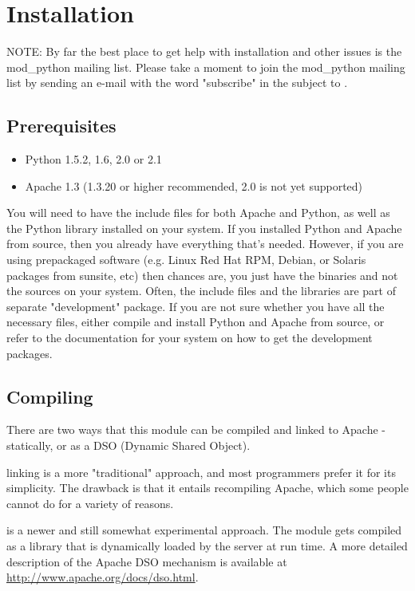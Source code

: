 \chapter{Installation\label{installation}}
NOTE: By far the best place to get help with installation and other
issues is the mod_python mailing list. Please take a moment to join
the mod_python mailing list by sending an e-mail with the word
"subscribe" in the subject to .

\section{Prerequisites\label{inst-prerequisites}}

\begin{itemize}
\item
Python 1.5.2, 1.6, 2.0 or 2.1
\item
Apache 1.3 (1.3.20 or higher recommended, 2.0 is not yet supported) 
\end{itemize}

You will need to have the include files for both Apache and Python, as
well as the Python library installed on your system.  If you installed
Python and Apache from source, then you already have everything that's
needed. However, if you are using prepackaged software (e.g. Linux Red
Hat RPM, Debian, or Solaris packages from sunsite, etc) then chances
are, you just have the binaries and not the sources on your
system. Often, the include files and the libraries are part of
separate "development" package. If you are not sure whether you have
all the necessary files, either compile and install Python and Apache
from source, or refer to the documentation for your system on how to
get the development packages.

\section{Compiling\label{inst-compiling}}

There are two ways that this module can be compiled and linked to
Apache - statically, or as a DSO (Dynamic Shared Object).

 linking is a more "traditional" approach, and most programmers
prefer it for its simplicity. The drawback is that it entails
recompiling Apache, which some people cannot do for a variety of
reasons. 

 is a newer and still somewhat experimental
approach. The module gets compiled as a library that is dynamically
loaded by the server at run time. A more detailed description of the
Apache DSO mechanism is available at
\url{http://www.apache.org/docs/dso.html}.

